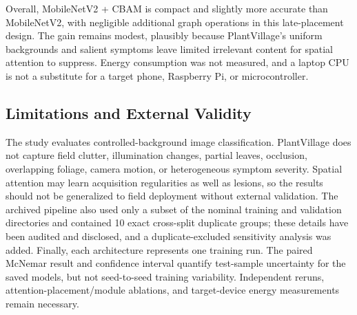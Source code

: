 Overall, MobileNetV2 + CBAM is compact and slightly more accurate than MobileNetV2, with negligible additional graph operations in this late-placement design. The gain remains modest, plausibly because PlantVillage's uniform backgrounds and salient symptoms leave limited irrelevant content for spatial attention to suppress. Energy consumption was not measured, and a laptop CPU is not a substitute for a target phone, Raspberry Pi, or microcontroller.

\subsection{Limitations and External Validity}

The study evaluates controlled-background image classification. PlantVillage does not capture field clutter, illumination changes, partial leaves, occlusion, overlapping foliage, camera motion, or heterogeneous symptom severity. Spatial attention may learn acquisition regularities as well as lesions, so the results should not be generalized to field deployment without external validation. The archived pipeline also used only a subset of the nominal training and validation directories and contained 10 exact cross-split duplicate groups; these details have been audited and disclosed, and a duplicate-excluded sensitivity analysis was added. Finally, each architecture represents one training run. The paired McNemar result and confidence interval quantify test-sample uncertainty for the saved models, but not seed-to-seed training variability. Independent reruns, attention-placement/module ablations, and target-device energy measurements remain necessary.
